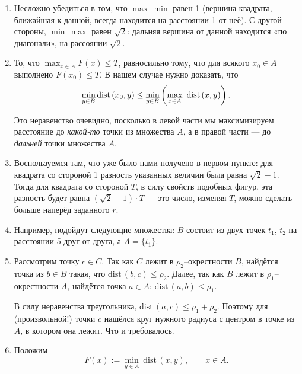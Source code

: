 \def\dist{\mathrm{dist}\,} \def\l#1{\limits_{#1}}
\def\Dist{\mathrm{DIST}\,}

\def\Dfst{\mathrm{DIST}_1\,}
\def\Dsnd{\mathrm{DIST}_2\,}

\begin{enumerate}

\item Несложно убедиться в том, что $\max\,\min$ равен 1 (вершина квадрата, ближайшая к данной, всегда находится на расстоянии 1 от неё). С другой стороны, $\min\,\max$ равен $\sqrt{2}$: дальняя вершина от данной находится «по диагонали», на рассоянии $\sqrt{2}$.

\item То, что $\max_{x \in A} F(x) \le T$, равносильно тому, что для всякого $x_0 \in A$ выполнено $F(x_0) \le T$. В нашем случае нужно доказать, что
$$\min\l{y \in B} \dist(x_0,y) \le \min\l{y \in B}
	\ll \max\l{x \in A}\ \dist (x,y) \rr.$$

Это неравенство очевидно, посколько в левой части мы максимизируем расстояние до {\itshape какой-то} точки из множества $A$, а в правой части — до {\itshape дальней} точки множества $A$.

\item Воспользуемся там, что уже было нами получено в первом пункте: для квадрата со стороной 1 разность указанных величин была равна $\sqrt 2 -1$. Тогда для квадрата со стороной $T$, в силу свойств подобных фигур, эта разность будет равна $(\sqrt 2 -1) \cdot T$ — это число, изменяя $T$, можно сделать больше наперёд заданного $r$.

\item Например, подойдут следующие множества: $B$ состоит из двух точек $t_1$, $t_2$ на расстоянии 5 друг от друга, а $A = \{ t_1 \}$.

\item Рассмотрим точку $c \in C$. Так как $C$ лежит в $\rho_2$–окрестности $B$, найдётся точка из $b \in B$ такая, что $\dist (b,c) \le \rho_2$. Далее, так как $B$ \linebreak  лежит в $\rho_1$--окрестности $A$, найдётся точка $a \in A$: $\dist (a,b) \le \rho_1$.

В силу неравенства треугольника, $\dist (a,c) \le \rho_1 + \rho_2$. Поэтому для (произвольной!) точки $c$ нашёлся круг нужного радиуса с центром в точке из $A$, в котором она лежит. Что и требовалось.

\item Положим
$$F(x) := \min\l{y \in A}\ \dist (x,y), \qquad x \in A.$$


\end{enumerate}

